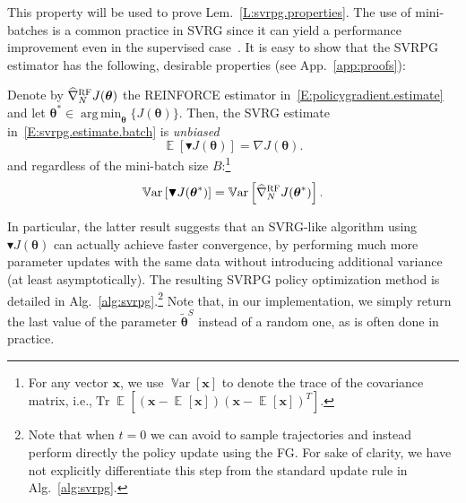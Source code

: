 \documentclass{article}
\makeatletter
\theoremstyle{remark}
\theoremstyle{definition}
\DeclareRobustCommand{\ie}{i.e.,\@\xspace}
\newcommand{\todomat}[1]{\todo[color=citrine, inline]{\small #1}}
\DeclareMathOperator*{\argmin}{arg\,min}
\DeclareMathOperator*{\EV}{\mathbb{E}}
\DeclareMathOperator{\Tr}{Tr}
\DeclareMathOperator*{\Var}{\mathbb{V}ar}
\newcommand{\EVV}[2][\ppvect \in \ppspace]{\EV_{#1}\left[{#2}\right]}
\newcommand{\vtheta}{\boldsymbol{\theta}}
\newcommand{\Reward}{\mathcal{R}}
\newcommand{\gradJ}[1]{\nabla J(#1)}
\newcommand{\gradApp}[2]{\widehat{\nabla}_{#2}J(#1)}
\newcommand{\gradBlack}[1]{\blacktriangledown J(#1)}
\newcommand{\wh}[1]{\widehat{#1}}
\makeatother
\begin{document}
This property will be used to prove Lem.~\ref{L:svrpg.properties}.
The use of mini-batches is a common practice in SVRG since it can yield a performance improvement even in the supervised case~\citep{harikandeh2015stopwasting,konevcny2016mini}. It is easy to show that the SVRPG estimator has the following, desirable properties (see App.~\ref{app:proofs}):
\begin{lemma}\label{L:svrpg.properties}
Denote by $\wh{\nabla}_N^{\textsc{RF}} J(\vtheta)$ the REINFORCE estimator in~\eqref{E:policygradient.estimate} and let $\vtheta^* \in \argmin_{\vtheta} \{J(\vtheta)\}$. Then, the SVRG estimate in~\eqref{E:svrpg.estimate.batch} is \emph{unbiased}
\[
\mathop{\mathbb{E}}
\left[\blacktriangledown J(\vtheta)\right] = \gradJ{\vtheta}.
\]
and regardless of the mini-batch size $B$:\footnote{
For any vector $\mathbf{x}$, we use $\Var[\mathbf{x}]$ to denote the trace of the covariance matrix, \ie $\Tr\EVV[]{(\mathbf{x}-\EVV[]{\mathbf{x}})(\mathbf{x}-\EVV[]{\mathbf{x}})^T}$.}
\[
	\Var\left[\gradBlack{\vtheta^*}\right] = 
    \Var\left[\wh{\nabla}_N^{\textsc{RF}}J(\vtheta^*)\right].
\]
\end{lemma}

In particular, the latter result suggests that an SVRG-like algorithm using $\gradBlack{\vtheta}$ can actually achieve faster convergence, by performing much more parameter updates with the same data without introducing additional variance (at least asymptotically).
The resulting SVRPG policy optimization method is detailed in Alg.~\ref{alg:svrpg}.\footnote{Note that when $t=0$ we can avoid to sample trajectories and instead perform directly the policy update using the FG. For sake of clarity, we have not explicitly differentiate this step from the standard update rule in Alg.~\ref{alg:svrpg}.} Note that, in our implementation, we simply return the last value of the parameter $\tilde{\vtheta}^S$ instead of a random one, as is often done in practice.
\todomat{add reference}
\end{document}
